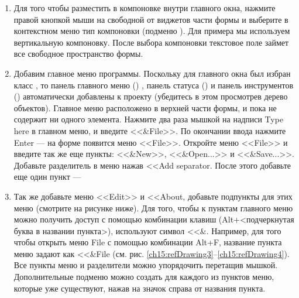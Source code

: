 \begin{enumerate}
\item Для того чтобы разместить  в компоновке внутри главного окна, нажмите правой
кнопкой мыши на свободной от виджетов части формы и выберите в контекстном меню тип компоновки (подменю
). Для примера мы используем вертикальную компоновку. После выбора компоновки текстовое
поле займет все свободное пространство формы.
\item Добавим главное меню программы. Поскольку для главного окна был избран класс , то панель главного меню
() , панель статуса () и панель инструментов () автоматически добавлены к проекту (убедитесь
в этом просмотрев дерево объектов). Главное меню расположено в верхней части формы, и пока не содержит ни одного
элемента. Нажмите два раза мышкой на надписи Type here в главном меню, и введите <<\&File>>. По окончании
ввода нажмите Enter --- на форме появится меню <<File>>. Откройте меню <<File>> и введите так же
еще пункты: <<\&New>>, <<\&Open...>> и <<\&Save...>>. Добавьте разделитель в меню
нажав <<Add separator. После этого добавьте еще один пункт ---  
\item Так же добавьте меню <<Edit>> и <<About, добавьте подпункты для этих меню (смотрите на
рисунке ниже). Для того, чтобы к пунктам главного меню можно получить доступ с помощью комбинации клавиш
(Alt+{<}подчеркнутая буква в названии пункта{>}), используют символ <<\&. Например,
для того чтобы открыть меню File с помощью комбинации Alt+F, название пункта меню задают как <<\&File
(см. рис. \ref{ch15:refDrawing3}--\ref{ch15:refDrawing4}). Все пункты меню и разделители можно упорядочить перетащив
мышкой. Дополнительные подменю можно создать для каждого из пунктов меню, которые уже существуют, нажав на значок
справа от названия пункта. 
\end{enumerate}
{\centering\itshape
 
\par}


